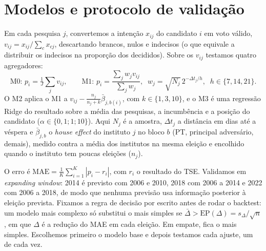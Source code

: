 \documentclass[10pt,a4paper]{article}
\begin{document}
\section{Modelos e protocolo de validação}
Em cada pesquisa $j$, convertemos a intenção $x_{ij}$ do candidato $i$ em voto válido, $v_{ij}=x_{ij}/\sum_{c}x_{cj}$, descartando brancos, nulos e indecisos (o que equivale a distribuir os indecisos na proporção dos decididos). Sobre os $v_{ij}$ testamos quatro agregadores:
\begin{equation}
\text{M0: } p_i=\tfrac{1}{J}\textstyle\sum_{j} v_{ij}, \qquad
\text{M1: } p_i=\frac{\sum_j w_j v_{ij}}{\sum_j w_j},\;\; w_j=\sqrt{N_j}\,2^{-\Delta t_j/h},\;\; h\in\{7,14,21\}.
\end{equation}
O M2 aplica o M1 a $v_{ij}-\frac{n_j}{n_j+k}\bar\beta_{j,b(i)}$, com $k\in\{1,3,10\}$, e o M3 é uma regressão Ridge do resultado sobre a média das pesquisas, a incumbência e a posição do candidato ($\alpha\in\{0{,}1;1;10\}$).
Aqui $N_j$ é a amostra, $\Delta t_j$ a distância em dias até a véspera e $\bar\beta_{j,b}$ o \emph{house effect} do instituto $j$ no bloco $b$ (PT, principal adversário, demais), medido contra a média dos institutos na mesma eleição e encolhido quando o instituto tem poucas eleições ($n_j$).

O erro é $\text{MAE}=\frac{1}{K}\sum_{i=1}^{K}|p_i-r_i|$, com $r_i$ o resultado do TSE. Validamos em \emph{expanding window}: 2014 é previsto com 2006 e 2010, 2018 com 2006 a 2014 e 2022 com 2006 a 2018, de modo que nenhuma previsão usa informação posterior à eleição prevista. Fixamos a regra de decisão por escrito antes de rodar o backtest: um modelo mais complexo só substitui o mais simples se $\bar\Delta>\text{EP}(\Delta)=s_\Delta/\sqrt{n}$, em que $\Delta$ é a redução do MAE em cada eleição. Em empate, fica o mais simples. Escolhemos primeiro o modelo base e depois testamos cada ajuste, um de cada vez.
\end{document}
